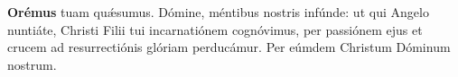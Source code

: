 \textbf{Orémus}
 tuam qu{\'\ae}sumus. Dómine, méntibus nostris infúnde: ut qui Angelo nuntiáte,
Christi Filii tui incarnatiónem cognóvimus, per passiónem ejus et crucem ad resurrectiónis glóriam perducámur.
Per eúmdem Christum Dóminum nostrum.  